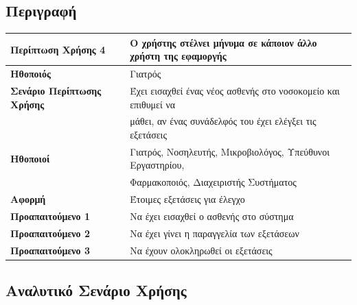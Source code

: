 \documentclass{article}
\newcommand\T{\rule{0pt}{2.6ex}}       %
\newcommand\B{\rule[-1.2ex]{0pt}{0pt}}
\begin{document}
\subsection{Περιγραφή}

\begin{center}
     \begin{tabular}{|l|l|}
     \hline
      \textbf{Περίπτωση Χρήσης 4} & Ο χρήστης στέλνει μήνυμα σε κάποιον άλλο χρήστη της εφαμοργής \T\B \\ 
      \hline
      \textbf{Ηθοποιός} & Γιατρός \T\B \\
      \hline
      \textbf{Σενάριο Περίπτωσης Χρήσης} & Έχει εισαχθεί ένας νέος ασθενής στο νοσοκομείο και επιθυμεί να \T \\& μάθει, αν ένας συνάδελφός του έχει ελέγξει τις εξετάσεις \B \\
      \hline
      \textbf{Ηθοποιοί} & Γιατρός, Νοσηλευτής, Μικροβιολόγος, Υπεύθυνοι Εργαστηρίου, \T \\& Φαρμακοποιός, Διαχειριστής Συστήματος \T\B \\
      \hline
      \textbf{Αφορμή} & Έτοιμες εξετάσεις για έλεγχο \T\B \\
      \hline
      \textbf{Προαπαιτούμενο 1} & Να έχει εισαχθεί ο ασθενής στο σύστημα \T\B \\
      \hline
      \textbf{Προαπαιτούμενο 2} & Να έχει γίνει η παραγγελία των εξετάσεων \T\B \\
      \hline
      \textbf{Προαπαιτούμενο 3} & Να έχουν ολοκληρωθεί οι εξετάσεις \T\B \\
      \hline
     \end{tabular}
 \end{center}
 
  \newpage
 
 \subsection{Αναλυτικό Σενάριο Χρήσης}
\end{document}
